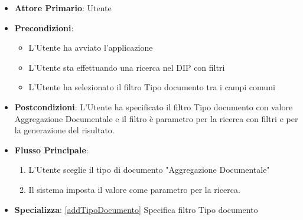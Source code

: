 \begin{itemize}
      \item \textbf{Attore Primario}: Utente
      \item \textbf{Precondizioni}: \begin{itemize}
            \item L'Utente ha avviato l'applicazione
            \item L'Utente sta effettuando una ricerca nel DIP con filtri
            \item L'Utente ha selezionato il filtro Tipo documento tra i campi comuni
      \end{itemize}
      \item \textbf{Postcondizioni}: L'Utente ha specificato il filtro Tipo documento con valore Aggregazione Documentale e il filtro è parametro per la ricerca con filtri e per la generazione del risultato.
      \item \textbf{Flusso Principale}:
      \begin{enumerate}
            \item L'Utente sceglie il tipo di documento "Aggregazione Documentale"
            \item Il sistema imposta il valore come parametro per la ricerca.
      \end{enumerate}
      \item \textbf{Specializza}: \ref{addTipoDocumento} Specifica filtro Tipo documento
\end{itemize}

